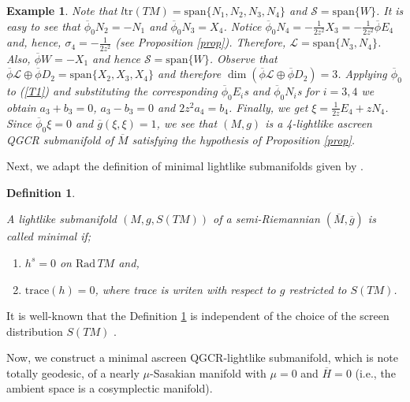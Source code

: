 \documentclass[reqno, 12pt]{amsart}
\numberwithin{equation}{section}
\newtheorem{definition}[theorem]{Definition}
\newtheorem{example}[theorem]{Example}
\begin{document}
\begin{example}
{Note that $l\mathrm{tr}(TM)=\mathrm{span}\{N_{1},N_{2},N_{3},N_{4}\}$ and $\mathcal{S}=\mbox{span}\{W\}$. It is easy to see that $\overline{\phi}_{0} N_{2}=-N_{1}$ and $\overline{\phi}_{0} N_{3}=X_{4}$. Notice $\overline{\phi}_{0} N_{4}=-\frac{1}{2z^{2}}X_{3}=-\frac{1}{2z^{2}}\overline{\phi}E_{4}$ and, hence, $\sigma_{4}=-\frac{1}{2z^{2}}$ (see Proposition \ref{prop}). Therefore, $\mathcal{L}=\mathrm{span}\{N_{3},N_{4}\}$.  Also, $\overline{\phi}W=-X_{1}$ and hence $\mathcal{S}=\mathrm{span}\{W\}$. Observe that $\overline{\phi}\mathcal{L}\oplus  \overline{\phi}D_{2}=\mbox{span}\{X_{2}, X_{3},X_{4}\}$ and therefore $\dim(\overline{\phi}\mathcal{L}\oplus  \overline{\phi}D_{2})=3$. Applying $\overline{\phi}_{0}$ to  (\ref{T1}) and substituting the corresponding $\overline{\phi}_{0}E_{i}$s and $\overline{\phi}_{0}N_{i}$s for $i=3,4$ we obtain $a_{3}+b_{3}=0$, $a_{3}-b_{3}=0$ and $2z^{2}a_{4}=b_{4}$.  Finally, we get $\xi=\frac{1}{2z}E_{4}+zN_{4}$.  Since $\overline{\phi}_0\xi=0$ and $\overline{g}(\xi,\xi)=1$, we see that $(M,g)$ is a 4-lightlike ascreen QGCR submanifold of $\overline{M}$ satisfying the hypothesis of Proposition \ref{prop}.
 }
\end{example}

Next, we adapt the definition of minimal lightlike submanifolds given by \cite{ds3}.
\begin{definition} \label{mini}{\rm
 A lightlike submanifold $(M,g,S(TM))$ of a semi-Riemannian $(\overline{M},\overline{g})$ is called minimal if;
 \begin{enumerate}
  \item  $h^{s}=0$ on $\mathrm{Rad} \, TM$ and,
  \item $\mathrm{trace}(h)=0$, where trace is writen with respect to $g$ restricted to $S(TM)$.
 \end{enumerate}}
\end{definition}
It is well-known that the Definition \ref{mini} is independent of the choice of the screen distribution $S(TM)$ \cite{ds3}.  

Now, we construct a minimal ascreen QGCR-lightlike submanifold, which is note totally geodesic, of a  nearly $\mu$-Sasakian manifold with $\mu=0$ and $\overline{H}=0$ (i.e., the ambient space is a cosymplectic manifold).
\end{document}
